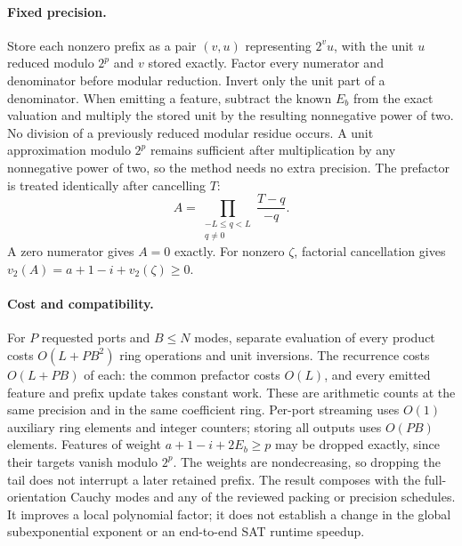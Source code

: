 \paragraph{Fixed precision.}
Store each nonzero prefix as a pair $(v,u)$ representing $2^v u$, with the
unit $u$ reduced modulo $2^p$ and $v$ stored exactly. Factor every numerator
and denominator before modular reduction. Invert only the unit part of a
denominator. When emitting a feature, subtract the known $E_b$ from the
exact valuation and multiply the stored unit by the resulting nonnegative
power of two. No division of a previously reduced modular residue occurs.
A unit approximation modulo $2^p$ remains sufficient after multiplication
by any nonnegative power of two, so the method needs no extra precision.
The prefactor is treated identically after cancelling $T$:
\[
 A=\prod_{\substack{-L\leq q<L\\q\ne0}}\frac{T-q}{-q}.
\]
A zero numerator gives $A=0$ exactly. For nonzero $\zeta$, factorial
cancellation gives
$v_2(A)=a+1-i+v_2(\zeta)\geq0$.

\paragraph{Cost and compatibility.}
For $P$ requested ports and $B\leq N$ modes, separate evaluation of every
product costs $O(L+PB^2)$ ring operations and unit inversions. The recurrence
costs $O(L+PB)$ of each: the common prefactor costs $O(L)$, and every emitted
feature and prefix update takes constant work. These are arithmetic counts
at the same precision and in the same coefficient ring. Per-port streaming
uses $O(1)$ auxiliary ring elements and integer counters; storing all outputs
uses $O(PB)$ elements. Features of weight
$a+1-i+2E_b\geq p$ may be dropped exactly, since their targets vanish modulo
$2^p$. The weights are nondecreasing, so dropping the tail does not interrupt
a later retained prefix. The result composes with the full-orientation
Cauchy modes and any of the reviewed packing or precision schedules.
It improves a local polynomial factor; it does not establish a change in
the global subexponential exponent or an end-to-end SAT runtime speedup.
